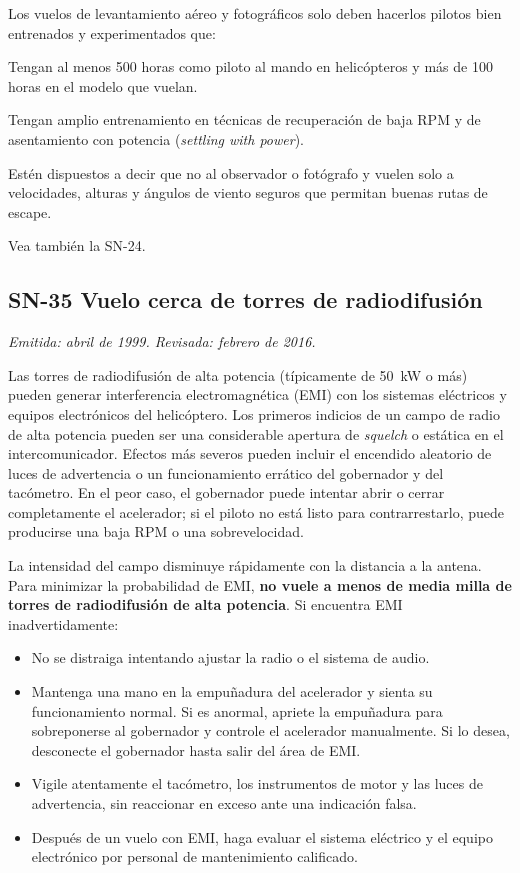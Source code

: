 Los vuelos de levantamiento aéreo y fotográficos solo deben hacerlos pilotos bien entrenados y experimentados que:

\begin{pasos}
\item Tengan al menos 500 horas como piloto al mando en helicópteros y más de 100 horas en el modelo que vuelan.
\item Tengan amplio entrenamiento en técnicas de recuperación de baja RPM y de asentamiento con potencia (\emph{settling with power}).
\item Estén dispuestos a decir que no al observador o fotógrafo y vuelen solo a velocidades, alturas y ángulos de viento seguros que permitan buenas rutas de escape.
\end{pasos}

Vea también la SN-24.

\subsection*{SN-35 \quad Vuelo cerca de torres de radiodifusión}
{\small\textit{Emitida: abril de 1999. Revisada: febrero de 2016.}}

Las torres de radiodifusión de alta potencia (típicamente de 50~kW o más) pueden generar interferencia electromagnética (EMI) con los sistemas eléctricos y equipos electrónicos del helicóptero. Los primeros indicios de un campo de radio de alta potencia pueden ser una considerable apertura de \emph{squelch} o estática en el intercomunicador. Efectos más severos pueden incluir el encendido aleatorio de luces de advertencia o un funcionamiento errático del gobernador y del tacómetro. En el peor caso, el gobernador puede intentar abrir o cerrar completamente el acelerador; si el piloto no está listo para contrarrestarlo, puede producirse una baja RPM o una sobrevelocidad.

La intensidad del campo disminuye rápidamente con la distancia a la antena. Para minimizar la probabilidad de EMI, \textbf{no vuele a menos de media milla de torres de radiodifusión de alta potencia}. Si encuentra EMI inadvertidamente:

\begin{itemize}
\item No se distraiga intentando ajustar la radio o el sistema de audio.
\item Mantenga una mano en la empuñadura del acelerador y sienta su funcionamiento normal. Si es anormal, apriete la empuñadura para sobreponerse al gobernador y controle el acelerador manualmente. Si lo desea, desconecte el gobernador hasta salir del área de EMI.
\item Vigile atentamente el tacómetro, los instrumentos de motor y las luces de advertencia, sin reaccionar en exceso ante una indicación falsa.
\item Después de un vuelo con EMI, haga evaluar el sistema eléctrico y el equipo electrónico por personal de mantenimiento calificado.
\end{itemize}

